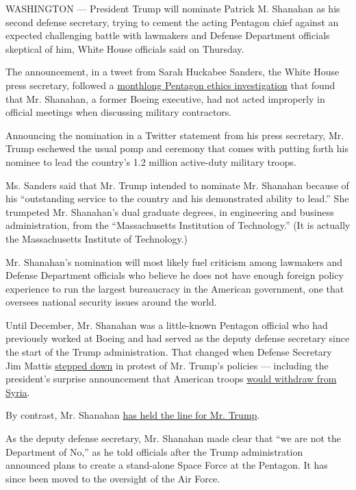 WASHINGTON --- President Trump will nominate Patrick M. Shanahan as his
second defense secretary, trying to cement the acting Pentagon chief
against an expected challenging battle with lawmakers and Defense
Department officials skeptical of him, White House officials said on
Thursday.

The announcement, in a tweet from Sarah Huckabee Sanders, the White
House press secretary, followed a
\href{https://www.nytimes.com/2019/04/25/us/politics/defense-shanahan-boeing-cleared.html?searchResultPosition=1}{monthlong
Pentagon ethics investigation} that found that Mr. Shanahan, a former
Boeing executive, had not acted improperly in official meetings when
discussing military contractors.

Announcing the nomination in a Twitter statement from his press
secretary, Mr. Trump eschewed the usual pomp and ceremony that comes
with putting forth his nominee to lead the country's 1.2 million
active-duty military troops.

Ms. Sanders said that Mr. Trump intended to nominate Mr. Shanahan
because of his ``outstanding service to the country and his demonstrated
ability to lead.'' She trumpeted Mr. Shanahan's dual graduate degrees,
in engineering and business administration, from the ``Massachusetts
Institution of Technology.'' (It is actually the Massachusetts Institute
of Technology.)

Mr. Shanahan's nomination will most likely fuel criticism among
lawmakers and Defense Department officials who believe he does not have
enough foreign policy experience to run the largest bureaucracy in the
American government, one that oversees national security issues around
the world.

Until December, Mr. Shanahan was a little-known Pentagon official who
had previously worked at Boeing and had served as the deputy defense
secretary since the start of the Trump administration. That changed when
Defense Secretary Jim Mattis
\href{https://www.nytimes.com/2018/12/20/us/politics/jim-mattis-defense-secretary-trump.html}{stepped
down} in protest of Mr. Trump's policies --- including the president's
surprise announcement that American troops
\href{https://www.nytimes.com/2018/12/19/us/politics/trump-syria-turkey-troop-withdrawal.html}{would
withdraw from Syria}.

By contrast, Mr. Shanahan
\href{https://www.nytimes.com/2019/02/26/us/politics/patrick-shanahan-trump.html}{has
held the line for Mr. Trump}.

As the deputy defense secretary, Mr. Shanahan made clear that ``we are
not the Department of No,'' as he told officials after the Trump
administration announced plans to create a stand-alone Space Force at
the Pentagon. It has since been moved to the oversight of the Air Force.

